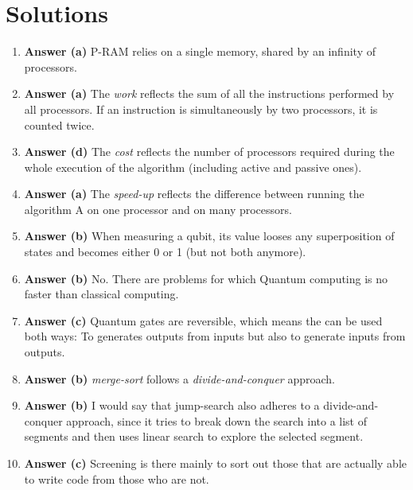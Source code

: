 \documentclass[11pt]{article}
\begin{document}
\section{Solutions}
\label{sec:orge9678ff}

\begin{enumerate}
\item \textbf{Answer (a)} P-RAM relies on a single memory, shared by an infinity
of processors.

\item \textbf{Answer (a)} The \emph{work} reflects the sum of all the instructions
performed by all processors. If an instruction is simultaneously by
two processors, it is counted twice.

\item \textbf{Answer (d)} The \emph{cost} reflects the number of processors required
during the whole execution of the algorithm (including active and
passive ones).

\item \textbf{Answer (a)} The \emph{speed-up} reflects the difference between running
the algorithm A on one processor and on many processors.

\item \textbf{Answer (b)} When measuring a qubit, its value looses any
superposition of states and becomes either 0 or 1 (but not both
anymore).

\item \textbf{Answer (b)} No. There are problems for which Quantum computing
is no faster than classical computing.

\item \textbf{Answer (c)} Quantum gates are reversible, which means the can be
used both ways: To generates outputs from inputs but also to
generate inputs from outputs.

\item \textbf{Answer (b)} \emph{merge-sort} follows a \emph{divide-and-conquer} approach.

\item \textbf{Answer (b)} I would say that jump-search also adheres to a
divide-and-conquer approach, since it tries to break down the
search into a list of segments and then uses linear search to explore
the selected segment.

\item \textbf{Answer (c)} Screening is there mainly to sort out those that are
actually able to write code from those who are not.
\end{enumerate}
\end{document}
